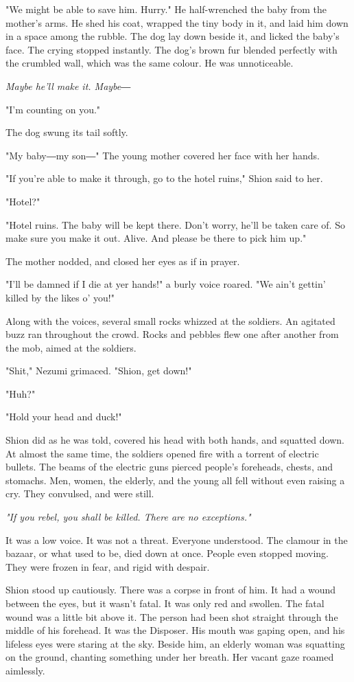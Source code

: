 "We might be able to save him. Hurry." He half-wrenched the baby from
the mother's arms. He shed his coat, wrapped the tiny body in it, and
laid him down in a space among the rubble. The dog lay down beside it,
and licked the baby's face. The crying stopped instantly. The dog's
brown fur blended perfectly with the crumbled wall, which was the same
colour. He was unnoticeable.

\emph{Maybe he'll make it. Maybe―}

"I'm counting on you."

The dog swung its tail softly.

"My baby―my son―" The young mother covered her face with her hands.

"If you're able to make it through, go to the hotel ruins," Shion said
to her.

"Hotel?"

"Hotel ruins. The baby will be kept there. Don't worry, he'll be taken
care of. So make sure you make it out. Alive. And please be there to
pick him up."

The mother nodded, and closed her eyes as if in prayer.

"I'll be damned if I die at yer hands!" a burly voice roared. "We ain't
gettin' killed by the likes o' you!"

Along with the voices, several small rocks whizzed at the soldiers. An
agitated buzz ran throughout the crowd. Rocks and pebbles flew one after
another from the mob, aimed at the soldiers.

"Shit," Nezumi grimaced. "Shion, get down!"

"Huh?"

"Hold your head and duck!"

Shion did as he was told, covered his head with both hands, and squatted
down. At almost the same time, the soldiers opened fire with a torrent
of electric bullets. The beams of the electric guns pierced people's
foreheads, chests, and stomachs. Men, women, the elderly, and the young
all fell without even raising a cry. They convulsed, and were still.

\emph{"If you rebel, you shall be killed. There are no exceptions."}

It was a low voice. It was not a threat. Everyone understood. The
clamour in the bazaar, or what used to be, died down at once. People
even stopped moving. They were frozen in fear, and rigid with despair.

Shion stood up cautiously. There was a corpse in front of him. It had a
wound between the eyes, but it wasn't fatal. It was only red and
swollen. The fatal wound was a little bit above it. The person had been
shot straight through the middle of his forehead. It was the Disposer.
His mouth was gaping open, and his lifeless eyes were staring at the
sky. Beside him, an elderly woman was squatting on the ground, chanting
something under her breath. Her vacant gaze roamed aimlessly.


